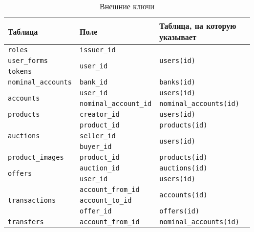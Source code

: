 \begin{table}[!th]
    \centering
    \caption{Внешние ключи}
    \label{tab:db-foreign-keys-1}
    \begin{tabular}{|p{5cm}|p{5.5cm}|p{5cm}|}
         \hline
         \textbf{Таблица} & \textbf{Поле} & \textbf{Таблица, на которую указывает} \\
         \hline
         \multirow{2}{3cm}{\texttt{roles}} & \texttt{issuer\_id} & \multirow{4}{3cm}{\texttt{users(id)}} \\
         \cline{2-2}
         & \multirow{3}{3cm}{\texttt{user\_id}} & \\
         \cline{1-1}
         \texttt{user\_forms} & & \\
         \cline{1-1}
         \texttt{tokens} & & \\
         \cline{1-3}
         \texttt{nominal\_accounts} & \texttt{bank\_id} & \texttt{banks(id)} \\
         \hline
         \multirow{2}{3cm}{\texttt{accounts}} & \texttt{user\_id} & \texttt{users(id)} \\
         \cline{2-3}
         & \texttt{nominal\_account\_id} & \texttt{nominal\_accounts(id)} \\
         \hline
         \texttt{products} & \texttt{creator\_id} & \texttt{users(id)} \\
         \hline
         \multirow{3}{3cm}{\texttt{auctions}} & \texttt{product\_id} & \texttt{products(id)} \\
         \cline{2-3}
         & \texttt{seller\_id} & \multirow{2}{3cm}{\texttt{users(id)}} \\       
         \cline{2-2}
         & \texttt{buyer\_id} & \\
         \hline
         \texttt{product\_images} & \texttt{product\_id} & \texttt{products(id)} \\
         \hline
         \multirow{2}{3cm}{\texttt{offers}} & \texttt{auction\_id} & \texttt{auctions(id)} \\
         \cline{2-3}
         & \texttt{user\_id} & \texttt{users(id)} \\
         \hline
         \multirow{3}{3cm}{\texttt{transactions}} & \texttt{account\_from\_id} & \multirow{2}{3cm}{\texttt{accounts(id)}}  \\
         \cline{2-2}
         & \texttt{account\_to\_id} & \\
         \cline{2-3}
         & \texttt{offer\_id} & \texttt{offers(id)} \\
         \hline
         \multirow{3}{3cm}{\texttt{transfers}} & \texttt{account\_from\_id} & \multirow{2}{3cm}{\texttt{nominal\_accounts(id)}} \\

\end{tabular}
\end{table}
